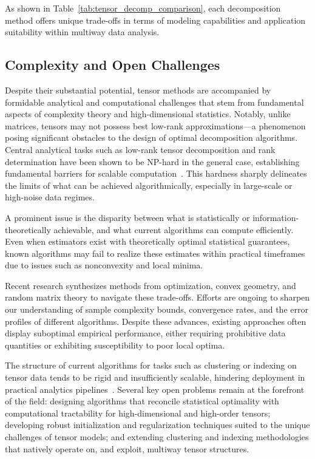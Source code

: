\documentclass[sigconf]{acmart}
\begin{document}
As shown in Table~\ref{tab:tensor_decomp_comparison}, each decomposition method offers unique trade-offs in terms of modeling capabilities and application suitability within multiway data analysis.

\subsection{Complexity and Open Challenges}

Despite their substantial potential, tensor methods are accompanied by formidable analytical and computational challenges that stem from fundamental aspects of complexity theory and high-dimensional statistics. Notably, unlike matrices, tensors may not possess best low-rank approximations—a phenomenon posing significant obstacles to the design of optimal decomposition algorithms. Central analytical tasks such as low-rank tensor decomposition and rank determination have been shown to be NP-hard in the general case, establishing fundamental barriers for scalable computation~\cite{ref104}. This hardness sharply delineates the limits of what can be achieved algorithmically, especially in large-scale or high-noise data regimes.

A prominent issue is the disparity between what is statistically or information-theoretically achievable, and what current algorithms can compute efficiently. Even when estimators exist with theoretically optimal statistical guarantees, known algorithms may fail to realize these estimates within practical timeframes due to issues such as nonconvexity and local minima.

Recent research synthesizes methods from optimization, convex geometry, and random matrix theory to navigate these trade-offs. Efforts are ongoing to sharpen our understanding of sample complexity bounds, convergence rates, and the error profiles of different algorithms. Despite these advances, existing approaches often display suboptimal empirical performance, either requiring prohibitive data quantities or exhibiting susceptibility to poor local optima.

The structure of current algorithms for tasks such as clustering or indexing on tensor data tends to be rigid and insufficiently scalable, hindering deployment in practical analytics pipelines~\cite{ref104}. Several key open problems remain at the forefront of the field: designing algorithms that reconcile statistical optimality with computational tractability for high-dimensional and high-order tensors; developing robust initialization and regularization techniques suited to the unique challenges of tensor models; and extending clustering and indexing methodologies that natively operate on, and exploit, multiway tensor structures.
\end{document}
